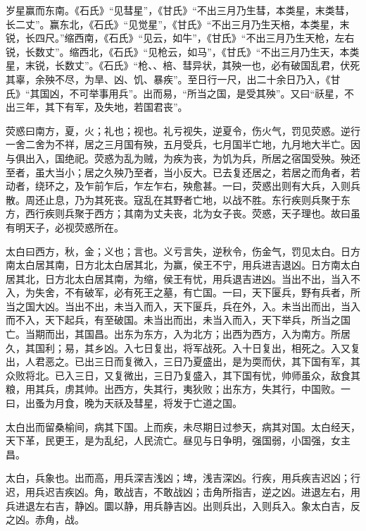\documentclass[12pt,UTF8]{ctexbook}
\begin{document}
岁星赢而东南。《石氏》“见彗星”，《甘氏》“不出三月乃生彗，本类星，末类彗，长二丈”。赢东北，《石氏》“见觉星”，《甘氏》“不出三月乃生天棓，本类星，末锐，长四尺。”缩西南，《石氏》“见云，如牛”，《甘氏》“不出三月乃生天枪，左右锐，长数丈”。缩西北，《石氏》“见枪云，如马”，《甘氏》“不出三月乃生天，本类星，末锐，长数丈”。《石氏》“枪、、棓、彗异状，其殃一也，必有破国乱君，伏死其辜，余殃不尽，为旱、凶、饥、暴疾”。至日行一尺，出二十余日乃入，《甘氏》“其国凶，不可举事用兵”。出而易，“所当之国，是受其殃”。又曰“祅星，不出三年，其下有军，及失地，若国君丧”。



荧惑曰南方，夏，火；礼也；视也。礼亏视失，逆夏令，伤火气，罚见荧惑。逆行一舍二舍为不祥，居之三月国有殃，五月受兵，七月国半亡地，九月地大半亡。因与俱出入，国绝祀。荧惑为乱为贼，为疾为丧，为饥为兵，所居之宿国受殃。殃还至者，虽大当小；居之久殃乃至者，当小反大。已去复还居之，若居之而角者，若动者，绕环之，及乍前乍后，乍左乍右，殃愈甚。一曰，荧惑出则有大兵，入则兵散。周还止息，乃为其死丧。寇乱在其野者亡地，以战不胜。东行疾则兵聚于东方，西行疾则兵聚于西方；其南为丈夫丧，北为女子丧。荧惑，天子理也。故曰虽有明天子，必视荧惑所在。



太白曰西方，秋，金；义也；言也。义亏言失，逆秋令，伤金气，罚见太白。日方南太白居其南，日方北太白居其北，为赢，侯王不宁，用兵进吉退凶。日方南太白居其北，日方北太白居其南，为缩，侯王有忧，用兵退吉进凶。当出不出，当入不入，为失舍，不有破军，必有死王之墓，有亡国。一曰，天下匽兵，野有兵者，所当之国大凶。当出不出，未当入而入，天下匽兵，兵在外，入。未当出而出，当入而不入，天下起兵，有至破国。未当出而出，未当入而入，天下举兵，所当之国亡。当期而出，其国昌。出东为东方，入为北方；出西为西方，入为南方。所居久，其国利；易，其乡凶。入七日复出，将军战死。入十日复出，相死之。入又复出，人君恶之。已出三日而复微入，三日乃夏盛出，是为耎而伏，其下国有军，其众败将北。已入三日，又复微出，三日乃复盛入，其下国有忧，帅师虽众，敌食其粮，用其兵，虏其帅。出西方，失其行，夷狄败；出东方，失其行，中国败。一曰，出蚤为月食，晚为天祅及彗星，将发于亡道之国。



太白出而留桑榆间，病其下国。上而疾，未尽期日过参天，病其对国。太白经天，天下革，民更王，是为乱纪，人民流亡。昼见与日争明，强国弱，小国强，女主昌。



太白，兵象也。出而高，用兵深吉浅凶；埤，浅吉深凶。行疾，用兵疾吉迟凶；行迟，用兵迟吉疾凶。角，敢战吉，不敢战凶；击角所指吉，逆之凶。进退左右，用兵进退左右吉，静凶。圜以静，用兵静吉凶。出则兵出，入则兵入。象太白吉，反之凶。赤角，战。
\end{document}
